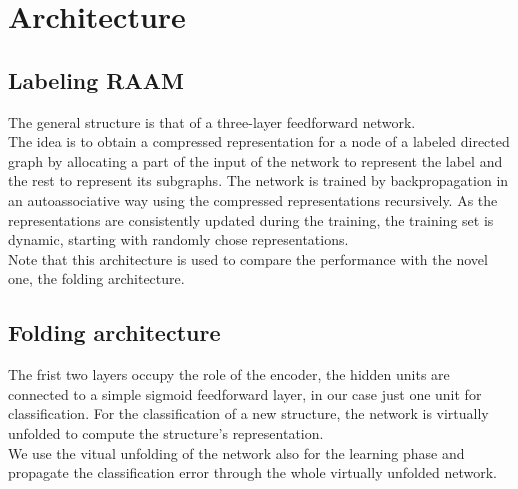 \section{Architecture}

\subsection{Labeling RAAM}

The general structure is that of a three-layer feedforward network.\\
The idea is to obtain a compressed representation for a node of a labeled
directed graph by allocating a part of the input of the network to represent the
label and the rest to represent its subgraphs. The network is trained by
backpropagation in an autoassociative way using the compressed representations
recursively. As the representations are consistently updated during the
training, the training set is dynamic, starting with randomly chose
representations.\\
Note that this architecture is used to compare the performance with the novel
one, the folding architecture.

\subsection{Folding architecture}

The frist two layers occupy the role of the encoder, the hidden units are
connected to a simple sigmoid feedforward layer, in our case just one unit for
classification. For the classification of a new structure, the network is
virtually unfolded to compute the structure's representation.\\
We use the vitual unfolding of the network also for the learning phase and
propagate the classification error through the whole virtually unfolded network.
